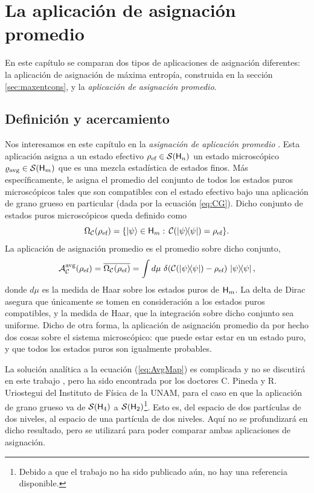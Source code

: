 \chapter{La aplicación de asignación promedio}\label{ch:5}

En este capítulo se comparan dos tipos de aplicaciones de asignación diferentes: la aplicación de asignación de máxima entropía, construida en la sección \ref{sec:maxentcons}, y la \textit{aplicación de asignación promedio}.

\section{Definición y acercamiento}

Nos interesamos en este capítulo en la \textit{asignación de aplicación promedio} \cite{Macro-To-Micro}. Esta aplicación asigna a un estado efectivo $\rho_{\text{ef}} \in \mathcal{S}({\sf H}_{n})$ un estado microscópico $\varrho_{\text{avg}} \in \mathcal{S}({\sf H}_{m})$ que es una mezcla estadística de estados finos. Más específicamente, le asigna el promedio del conjunto de todos los estados puros microscópicos tales que son compatibles con el estado efectivo bajo una aplicación de grano grueso en particular (dada por la ecuación \ref{eq:CG}). Dicho conjunto de estados puros microscópicos queda definido como
\begin{equation}\label{eq:Omega}
    \Omega_{\mcC}(\rho_{\ef}) = \{\ket{\psi}\in\hilbert_{m}:\, \mcC(\dyad{\psi}) = \rho_{\ef}  \}.
\end{equation}
La aplicación de asignación promedio es el promedio sobre dicho conjunto, \ie 
\begin{equation}\label{eq:AvgMap}
    \mcA_{\mcC}^{\avg}(\rho_{\ef}) = \overline{\Omega_{\mcC}(\rho_{\ef})} = \int d \mu\,\, \delta(\mcC(\dyad{\psi})-\rho_{\ef})\,\dyad{\psi},
\end{equation}
donde $d\mu$ es la medida de Haar sobre los estados puros de ${\sf H}_{m}$. La delta de Dirac asegura que únicamente se tomen en consideración a los estados puros compatibles, y la medida de Haar, que la integración sobre dicho conjunto sea uniforme. Dicho de otra forma, la aplicación de asignación promedio da por hecho dos cosas sobre el sistema microscópico: que puede estar estar en un estado puro, y que todos los estados puros son igualmente probables.

La solución analítica a la ecuación (\ref{eq:AvgMap}) es complicada y no se discutirá en este trabajo \cite{priv}, pero ha sido encontrada por los doctores C. Pineda y R. Uriostegui del Instituto de Física de la UNAM, para el caso en que la aplicación de grano grueso va de $\mathcal{S}({\sf H}_{4})$ a $\mathcal{S}({\sf H}_{2})$\footnote{Debido a que el trabajo no ha sido publicado aún, no hay una referencia disponible.}. Esto es, del espacio de dos partículas de dos niveles, al espacio de una partícula de dos niveles. Aquí no se profundizará en dicho resultado, pero se utilizará para poder comparar ambas aplicaciones de asignación.

